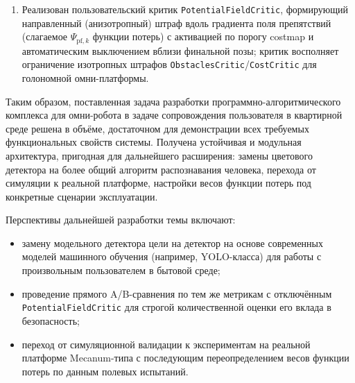 \begin{enumerate}
          в составе \texttt{nav2\_mppi\_controller}, непосредственно
          реализующий слагаемое функции потерь, отвечающее за
          центрирование цели в поле зрения камеры; критик корректно
          отключается при потере наблюдаемости цели, что соответствует
          теоретической формулировке.
    \item Реализован пользовательский критик
          \texttt{PotentialFieldCritic}, формирующий направленный
          (анизотропный) штраф вдоль градиента поля препятствий
          (слагаемое $\Psi_{\text{pf},k}$ функции потерь) с
          активацией по порогу costmap и автоматическим выключением
          вблизи финальной позы; критик восполняет ограничение
          изотропных штрафов \texttt{ObstaclesCritic}/\texttt{CostCritic}
          для голономной омни-платформы.
\end{enumerate}

Таким образом, поставленная задача разработки программно-алгоритмического
комплекса для омни-робота в задаче сопровождения пользователя в
квартирной среде решена в объёме, достаточном для демонстрации всех
требуемых функциональных свойств системы. Получена устойчивая и
модульная архитектура, пригодная для дальнейшего расширения: замены
цветового детектора на более общий алгоритм распознавания человека,
перехода от симуляции к реальной платформе, настройки весов функции
потерь под конкретные сценарии эксплуатации.

Перспективы дальнейшей разработки темы включают:
\begin{itemize}
    \item замену модельного детектора цели на детектор на основе
          современных моделей машинного обучения (например, YOLO-класса)
          для работы с произвольным пользователем в бытовой среде;
    \item проведение прямого A/B-сравнения по тем же метрикам
          с отключённым \texttt{PotentialFieldCritic} для строгой
          количественной оценки его вклада в безопасность;
    \item переход от симуляционной валидации к экспериментам на
          реальной платформе Mecanum-типа с последующим
          переопределением весов функции потерь по данным полевых
          испытаний.
\end{itemize}
